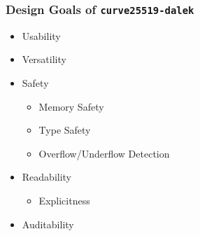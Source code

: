 \documentclass[xetex,aspectratio=169]{beamer}
\begin{document}
  \begin{frame}
    \frametitle{Design Goals of \texttt{curve25519-dalek}}

    \begin{itemize}
      \item<1-> Usability
      \item<2-> Versatility %
      \item<3-> Safety
        {\small
        \begin{itemize}
          \item<4-> Memory Safety
          \item<5-> Type Safety
          \item<6-> Overflow/Underflow Detection
        \end{itemize}
        }
      \item<7-> Readability 
        {\small
        \begin{itemize}
          \item<8-> Explicitness
        \end{itemize}
        }
      \item<10-> Auditability
    \end{itemize}


     

  \end{frame}
\end{document}

